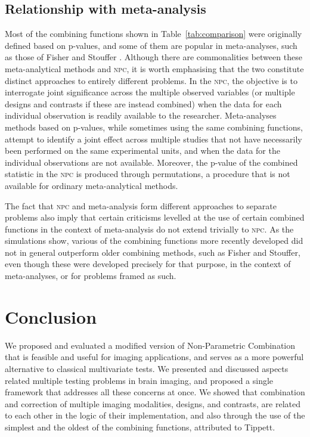 \subsection{Relationship with meta-analysis}

Most of the combining functions shown in Table~\ref{tab:comparison} were originally defined based on p-values, and some of them are popular in meta-analyses, such as those of Fisher and Stouffer \citep{Borenstein2009}. Although there are commonalities between these meta-analytical methods and \textsc{npc}, it is worth emphasising that the two constitute distinct approaches to entirely different problems. In the \textsc{npc}, the objective is to interrogate joint significance across the multiple observed variables (or multiple designs and contrasts if these are instead combined) when the data for each individual observation is readily available to the researcher. Meta-analyses methods based on p-values, while sometimes using the same combining functions, attempt to identify a joint effect across multiple studies that not have necessarily been performed on the same experimental units, and when the data for the individual observations are not available. Moreover, the p-value of the combined statistic in the \textsc{npc} is produced through permutations, a procedure that is not available for ordinary meta-analytical methods. 

The fact that \textsc{npc} and meta-analysis form different approaches to separate problems also imply that certain criticisms levelled at the use of certain combined functions in the context of meta-analysis do not extend trivially to \textsc{npc}. As the simulations show, various of the combining functions more recently developed did not in general outperform older combining methods, such as Fisher and Stouffer, even though these were developed precisely for that purpose, in the context of meta-analyses, or for problems framed as such.

\section{Conclusion}

We proposed and evaluated a modified version of Non-Parametric Combination that is feasible and useful for imaging applications, and serves as a more powerful alternative to classical multivariate tests. We presented and discussed aspects related multiple testing problems in brain imaging, and proposed a single framework that addresses all these concerns at once. We showed that combination and correction of multiple imaging modalities, designs, and contrasts, are related to each other in the logic of their implementation, and also through the use of the simplest and the oldest of the combining functions, attributed to Tippett.
